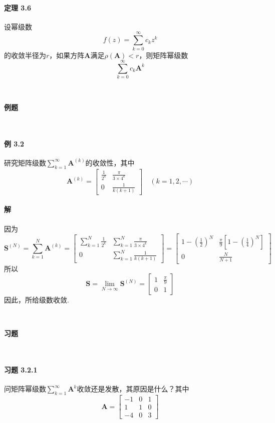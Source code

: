 \documentclass[12pt, a4paper, oneside, fontset=none]{ctexart}
\begin{document}
\paragraph*{定理 3.6} 设幂级数
\[
    f(z) = \sum_{k=0}^\infty c_kz^k
\]
的收敛半径为$r$，如果方阵$\bm{A}$满足$\rho(\bm{A}) < r$，则矩阵幂级数
\[
    \sum_{k = 0}^\infty c_k \bm{A}^k
\]

\par \ \par

\centerline{\large{\textbf{例题}}} \ \par

\paragraph*{例 3.2} 研究矩阵级数$\sum_{k = 1}^\infty \bm{A}^{(k)}$的收敛性，其中
\[
    \bm{A}^{(k)} = \begin{bmatrix}
        \frac{1}{2^k} & \frac{\pi}{3 \times 4^k} \\
        0             & \frac{1}{k(k + 1)}
    \end{bmatrix}\quad (k = 1,2,\cdots)
\]

\paragraph*{解} 因为
\[
    \bm{S}^{(N)} = \sum_{k = 1}^N \bm{A}^{(k)} = \begin{bmatrix}
        \sum_{k=1}^N \frac{1}{2^k} & \sum_{k=1}^N\frac{\pi}{3 \times 4^k} \\
        0                          & \sum_{k=1}^N\frac{1}{k(k + 1)}
    \end{bmatrix} = \begin{bmatrix}
        1 - (\frac{1}{2})^N & \frac{\pi}{9}[1 - (\frac{1}{4})^N] \\
        0                   & \frac{N}{N + 1}
    \end{bmatrix}
\]
所以
\[
    \bm{S} = \lim_{N\to \infty} \bm{S}^{(N)} = \begin{bmatrix}
        1 & \frac{\pi}{9} \\
        0 & 1
    \end{bmatrix}
\]
因此，所给级数收敛.

\par \ \par

\centerline{\large{\textbf{习题}}} \ \par

\paragraph*{习题 3.2.1} 问矩阵幂级数$\sum_{k = 1}^\infty \bm{A}^k$收敛还是发散，其原因是什么？其中
\[
    \bm{A} = \begin{bmatrix}
        -1 & 0 & 1 \\
        1  & 1 & 0 \\
        -4 & 0 & 3
    \end{bmatrix}
\]
\end{document}
